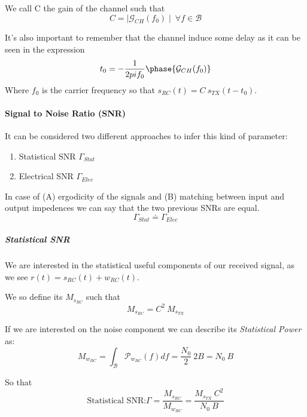 We call C the gain of the channel such that
\begin{equation}
C = \mid \mathcal{G}_{CH}(f_0) \mid \ \forall f \in \mathcal{B}
\end{equation}

It's also important to remember that the channel induce some delay as it can be seen in the expression
\begin{equation}
t_0 = -\frac{1}{2pif_0} \phase{\mathcal{G}_{CH}(f_0)}
\end{equation}
Where $f_0$ is the carrier frequency so that $s_{RC}(t) = C\ s_{TX}(t - t_0)$.

\paragraph{Signal to Noise Ratio (SNR)}
It can be considered two different approaches to infer this kind of parameter:
\begin{enumerate}
\item Statistical SNR $\Gamma_{Stat}$
\item Electrical SNR $\Gamma_{Elec}$
\end{enumerate}

In case of (A) ergodicity of the signals and (B) matching between input and output impedences we can say that the two previous SNRs are equal.
\begin{equation}
\Gamma_{Stat} \doteq \Gamma_{Elec}
\end{equation}

\subparagraph{Statistical SNR}
We are interested in the statistical useful components of our received signal, as we see $r(t) = s_{RC} (t) + w_{RC} (t)$.

We so define its  $M_{s_{RC}}$ such that
\begin{equation}
M_{s_{RC}} = C^2 \ M_{s_{TX}}
\end{equation}

If we are interested on the noise component we can describe its \textit{Statistical Power} as:
\begin{equation}
M_{w_{RC}} = \int_\mathcal{B} \mathcal{P}_{w_{RC}}(f) df = \frac{N_0}{2}\ 2B = N_0\ B
\end{equation}

So that
\begin{equation}
\text{Statistical SNR:} \Gamma = \frac{M_{s_{RC}}}{M_{w_{RC}}} = \frac{M_{s_{TX}}\ C^2}{N_0\ B}
\end{equation}


